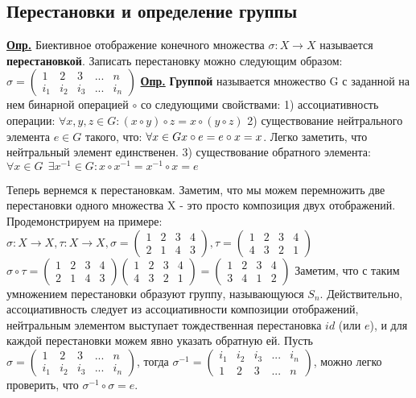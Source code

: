\documentclass{article}
\begin{document}
\begin{obeylines}
	
	\section*{Перестановки и определение группы}
	\underline{\textbf{Опр.}} Биективное отображение конечного множества $\sigma:  X \rightarrow X$ называется \textbf{перестановкой}.
	Записать перестановку можно следующим образом:
	$\sigma = \begin{pmatrix} 1 & 2 & 3 & ... & n \\ i_{1} & i_{2} & i_{3} & ... & i_{n} \end{pmatrix}$
	\underline{\textbf{Опр.}} \textbf{Группой} называется множество G с заданной на нем бинарной операцией $\circ$ со следующими свойствами:
		1) ассоциативность операции: $\forall x, y, z \in G: (x \circ y) \circ z = x \circ (y \circ z)$
		2) существование нейтрального элемента $e \in G$ такого, что: $\forall x \in G \\ x \circ e = e \circ x = x$. Легко заметить, что нейтральный элемент единственен.
		3) существование обратного элемента: $\forall x \in G \ \: \exists x^{-1}\in G: x \circ x^{-1} = x^{-1} \circ x = e$
		
	Теперь вернемся к перестановкам. Заметим, что мы можем перемножить две перестановки одного множества X - это просто композиция двух отображений. Продемонстрируем на примере:
	$ \sigma : X \rightarrow X, \tau : X \rightarrow X, \sigma = \begin{pmatrix} 1 & 2 & 3 & 4 \\ 2 & 1 & 4 & 3 \end{pmatrix}, \tau = \begin{pmatrix} 1 & 2 & 3 & 4 \\ 4 & 3 & 2 & 1 \end{pmatrix}$
	$\sigma \circ \tau = \begin{pmatrix} 1 & 2 & 3 & 4 \\ 2 & 1 & 4 & 3 \end{pmatrix} \begin{pmatrix} 1 & 2 & 3 & 4 \\ 4 & 3 & 2 & 1 \end{pmatrix} = \begin{pmatrix} 1 & 2 & 3 & 4 \\ 3 & 4 & 1 & 2 \end{pmatrix}$
	Заметим, что с таким умножением перестановки образуют группу, называющуюся $S_{n}$. Действительно, ассоциативность следует из ассоциативности композиции отображений, нейтральным элементом выступает тождественная перестановка $id$ (или $e$), и для каждой перестановки можем явно указать обратную ей. Пусть $ \sigma = \begin{pmatrix} 1 & 2 & 3 & ... & n \\ i_{1} & i_{2} & i_{3} & ... & i_{n} \end{pmatrix}$, тогда $\sigma^{-1} = \begin{pmatrix} i_{1} & i_{2} & i_{3} & ... & i_{n} \\ 1 & 2 & 3 & ... & n \end{pmatrix}$, можно легко проверить, что $\sigma^{-1} \circ \sigma = e$.
	

\end{obeylines}
\end{document}
